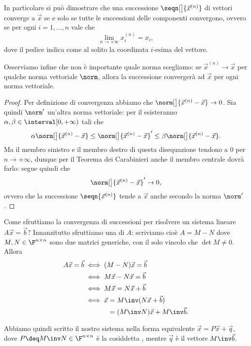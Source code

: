 In particolare si può dimostrare che una successione $\seqn[\big]{\vec x^{(n)}}$ di vettori converge a $\vec x$ se e solo se tutte le successioni delle componenti convergono, ovvero se per ogni $i = 1, \dots, n$ vale che \[
    \lim_{n \to +\infty} x_{i}^{(n)} = x_i,
\] dove il pedice indica come al solito la coordinata $i$-esima del vettore.

Osserviamo infine che non è importante quale norma scegliamo: se $\vec x^{(n)} \to \vec x$ per qualche norma vettoriale $\norm$, allora la successione convergerà ad $\vec x$ per ogni norma vettoriale.
\begin{proof}
    Per definizione di convergenza abbiamo che $\norm[\big]{\vec x^{(n)} - \vec x} \to 0$. Sia quindi $\norm'$ un'altra norma vettoriale: per il  esisteranno $\alpha, \beta \in \interval[{0, +\infty})$ tali che \[
        \alpha \norm[\big]{\vec x^{(n)} - \vec x} \leq \norm[\big]{\vec x^{(n)} - \vec x}' \leq \beta \norm[\big]{\vec x^{(n)} - \vec x}.
    \] Ma il membro sinistro e il membro destro di questa disequazione tendono a $0$ per $n \to +\infty$, dunque per il Teorema dei Carabinieri anche il membro centrale dovrà farlo: segue quindi che \[
        \norm[\big]{\vec x^{(n)} - \vec x}' \to 0,
    \] ovvero che la successione $\seqn{\vec x^{(n)}}$ tende a $\vec x$ anche secondo la norma $\norm'$.  
\end{proof}  

Come sfruttiamo la convergenza di successioni per risolvere un sistema lineare $A\vec x = \vec b$? Innanzitutto sfruttiamo una  di $A$: scriviamo cioè $A = M - N$ dove $M, N \in \Mat{\F, n, n}$ sono due matrici generiche, con il solo vincolo che $\det M \neq 0$. Allora \begin{align*}
    A\vec x = \vec b &\iff (M - N)\vec x = \vec b \\
    &\iff M\vec x - N\vec x = \vec b \\
    &\iff M\vec x = N\vec x + \vec b\\
    &\iff \vec x \begin{aligned}[t]
        &= M\inv(N\vec x + \vec b)\\
        &= (M\inv N)\vec x + M\inv\vec b.
    \end{aligned}
\end{align*} 

Abbiamo quindi scritto il nostro sistema nella forma equivalente $\vec x = P\vec x + \vec q$, dove $P \deq M\inv N \in \Mat{\F, n, n}$ è la cosiddetta , mentre $\vec q$ è il vettore $M\inv\vec b$.

